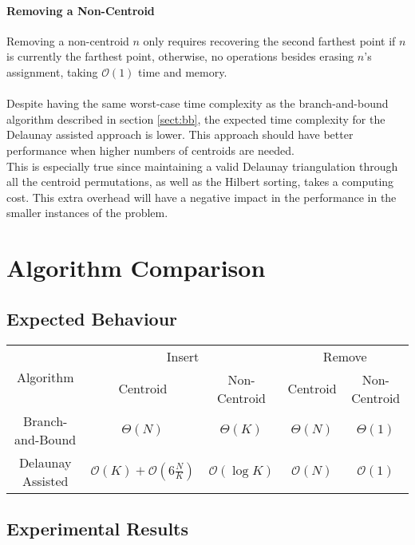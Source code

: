 \paragraph{Removing a Non-Centroid}
Removing a non-centroid $n$ only requires recovering the second farthest point if $n$ is currently the farthest point, otherwise, no operations besides erasing $n$'s assignment, taking $\mathcal{O}(1)$ time and memory.

\paragraph{}
Despite having the same worst-case time complexity as the branch-and-bound algorithm described in section \ref{sect:bb}, the expected time complexity for the Delaunay assisted approach is lower. This approach should have better performance when higher numbers of centroids are needed.\\
This is especially true since maintaining a valid Delaunay triangulation through all the centroid permutations, as well as the Hilbert sorting, takes a computing cost. This extra overhead will have a negative impact in the performance in the smaller instances of the problem.\\

\section{Algorithm Comparison}

\subsection{Expected Behaviour}

\begin{center}
\begin{tabular}{|c|c|c|c|c|}
	\hline
	\multirow{2}{*}{Algorithm}	& \multicolumn{2}{c|}{Insert}	& \multicolumn{2}{c|}{Remove}	\\ \cline{2-5}
								& Centroid		& Non-Centroid	& Centroid		& Non-Centroid	\\ \hline
		Branch-and-Bound		& $\Theta(N)$ & $\Theta(K)$ 
									& $\Theta(N)$ & $\Theta(1)$ \\ \hline
		Delaunay Assisted		& $\mathcal{O}(K)+\mathcal{O}(6\frac{N}{K})$& $\mathcal{O}(\log{K})$
									& $\mathcal{O}(N)$ & $\mathcal{O}(1)$\\ \hline
\end{tabular}
\end{center}

\subsection{Experimental Results}
